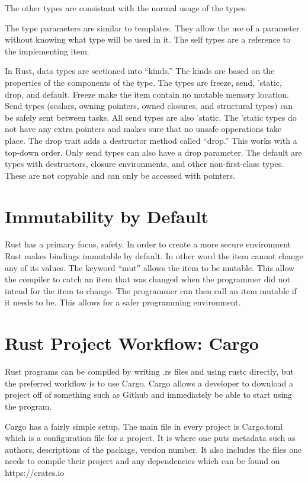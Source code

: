 \documentclass{article}
\begin{document}
The other types are consistant with the normal usage of the types.

The type parameters are similar to templates. They allow the use of a parameter without knowing what type will be used in it. The self types are a reference to the implementing item. 

In Rust, data types are sectioned into “kinds.” The kinds are based on the properties of the components of the type. The types are freeze, send, 'static, drop, and default. Freeze make the item contain no mutable memory location. Send types (scalars, owning pointers, owned closures, and structural types) can be safely sent between tasks. All send types are also 'static. The 'static types do not have any extra pointers and makes sure that no unsafe opperations take place. 
The drop trait adds a destructor method called “drop.” This works with a top-down order. Only send types can also have a drop parameter. The default are types with destructors, closure environments, and other non-first-class types. These are not copyable and can only be accessed with pointers.

\section{Immutability by Default}
Rust has a primary focus, safety. In order to create a more secure environment Rust makes bindings immutable by default. In other word the item cannot change any of its values. The keyword “mut” allows the item to be mutable. This allow the compiler to catch an item that was changed when the programmer did not intend for the item to change. The programmer can then call an item mutable if it needs to be. This allows for a safer programming environment.

\section{Rust Project Workflow: Cargo}
Rust programs can be compiled by writing .rs files and using rustc directly, but the preferred workflow is to use Cargo. Cargo allows a developer to download a project off of something such as Github and immediately be able to start using the program.

Cargo has a fairly simple setup. The main file in every project is Cargo.toml which is a configuration file for a project. It is where one puts metadata such as authors, descriptions of the package, version number. It also includes the files one needs to compile their project and any dependencies which can be found on https://crates.io
\end{document}
